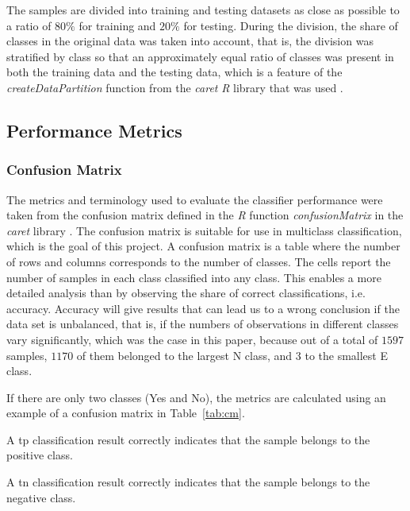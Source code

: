 \documentclass[sn-mathphys-num]{sn-jnl}%
\begin{document}
The samples are divided into training and testing datasets as close as possible to a ratio of $80\%$ for training and $20\%$ for testing. During the division, the share of classes in the original data was taken into account, that is, the division was stratified by class so that an approximately equal ratio of classes was present in both the training data and the testing data, which is a feature of the \textit{createDataPartition} function from the \textit{caret} \textit{R} library that was used \cite{KuhnDataSplitting2024, hyndman2018forecasting, createDataPartition2024}.

\subsection{Performance Metrics}

\subsubsection{Confusion Matrix}

The metrics and terminology used to evaluate the classifier performance were taken from the confusion matrix defined in the \textit{R} function \textit{confusionMatrix} in the \textit{caret} library \cite{kuhn2008building, altman1994diagnostic1, altman1994diagnostic2, velez2007balanced, confusionMatrix2024}. The confusion matrix is suitable for use in multiclass classification, which is the goal of this project. A confusion matrix is a table where the number of rows and columns corresponds to the number of classes. The cells report the number of samples in each class classified into any class. This enables a more detailed analysis than by observing the share of correct classifications, i.e. accuracy. Accuracy will give results that can lead us to a wrong conclusion if the data set is unbalanced, that is, if the numbers of observations in different classes vary significantly, which was the case in this paper, because out of a total of $1597$ samples, $1170$ of them belonged to the largest N class, and $3$ to the smallest E class.

If there are only two classes (Yes and No), the metrics are calculated using an example of a confusion matrix in Table~\ref{tab:cm}.

A \acrfull{tp} classification result correctly indicates that the sample belongs to the positive class.

A \acrfull{tn} classification result correctly indicates that the sample belongs to the negative class.
 
\end{document}
